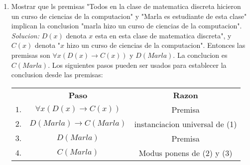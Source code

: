 \documentclass[]{article}
\begin{document}
\begin{enumerate}
	\item Mostrar que ls premisas "Todos en la clase de matematica discreta hicieron un curso de ciencias de la computacion" y "Marla es estudiante de esta clase" implican la conclusion "marla hizo un curso de ciencias de la computacion".\\
	\textit{Solucion:} $D(x)$ denota $x$ esta en esta clase de matematica discreta", y $C(x)$ denota "$x$ hizo un curso de ciencias de la computacion". Entonces las premisas son $\forall x (D(x) \rightarrow C(x))$ y $D(Marla)$. La conclucion es $C(Marla)$.
	Los siguientes pasos pueden ser usados para establecer la conclusion desde las premisas:
	\begin{table}[H]
		\begin{center}
			\begin{tabular}{ c c c }
				& \textbf{Paso} & \textbf{Razon}\\
				$1.$ & $\forall x(D(x) \rightarrow C(x))$ & Premisa\\
				$2.$ & $D(Marla) \rightarrow C(Marla)$ & instanciacion universal de (1)\\
				$3.$ & $D(Marla)$ & Premisa\\
				$4.$ & $C(Marla)$ & Modus ponens de (2) y (3)
			\end{tabular}
		\end{center}
	\end{table}


\end{enumerate}
\end{document}
